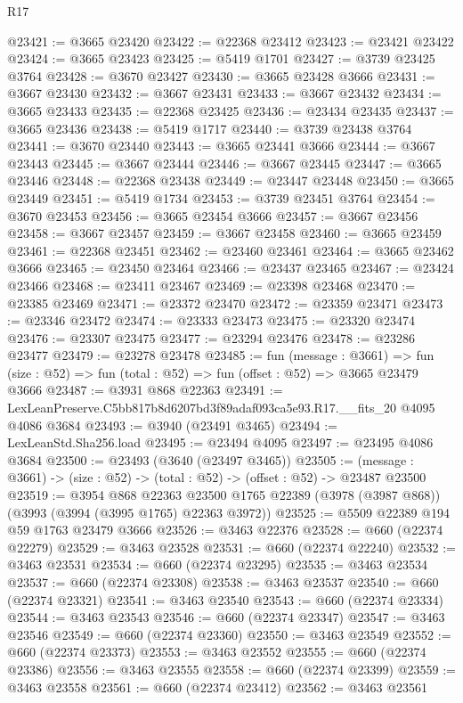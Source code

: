 \begin{lexlean}{R17}
\begin{coremodule}
@23421 := @3665 @23420
@23422 := @22368 @23412
@23423 := @23421 @23422
@23424 := @3665 @23423
@23425 := @5419 @1701
@23427 := @3739 @23425 @3764
@23428 := @3670 @23427
@23430 := @3665 @23428 @3666
@23431 := @3667 @23430
@23432 := @3667 @23431
@23433 := @3667 @23432
@23434 := @3665 @23433
@23435 := @22368 @23425
@23436 := @23434 @23435
@23437 := @3665 @23436
@23438 := @5419 @1717
@23440 := @3739 @23438 @3764
@23441 := @3670 @23440
@23443 := @3665 @23441 @3666
@23444 := @3667 @23443
@23445 := @3667 @23444
@23446 := @3667 @23445
@23447 := @3665 @23446
@23448 := @22368 @23438
@23449 := @23447 @23448
@23450 := @3665 @23449
@23451 := @5419 @1734
@23453 := @3739 @23451 @3764
@23454 := @3670 @23453
@23456 := @3665 @23454 @3666
@23457 := @3667 @23456
@23458 := @3667 @23457
@23459 := @3667 @23458
@23460 := @3665 @23459
@23461 := @22368 @23451
@23462 := @23460 @23461
@23464 := @3665 @23462 @3666
@23465 := @23450 @23464
@23466 := @23437 @23465
@23467 := @23424 @23466
@23468 := @23411 @23467
@23469 := @23398 @23468
@23470 := @23385 @23469
@23471 := @23372 @23470
@23472 := @23359 @23471
@23473 := @23346 @23472
@23474 := @23333 @23473
@23475 := @23320 @23474
@23476 := @23307 @23475
@23477 := @23294 @23476
@23478 := @23286 @23477
@23479 := @23278 @23478
@23485 := fun (message : @3661) =>
  fun (size : @52) => fun (total : @52) => fun (offset : @52) => @3665 @23479 @3666
@23487 := @3931 @868 @22363
@23491 := LexLeanPreserve.C5bb817b8d6207bd3f89adaf093ca5e93.R17.__fits_20 @4095 @4086 @3684
@23493 := @3940 (@23491 @3465)
@23494 := LexLeanStd.Sha256.load
@23495 := @23494 @4095
@23497 := @23495 @4086 @3684
@23500 := @23493 (@3640 (@23497 @3465))
@23505 := (message : @3661) -> (size : @52) -> (total : @52) -> (offset : @52) -> @23487 @23500
@23519 := @3954
    @868
    @22363
    @23500
    @1765
    @22389
    (@3978 (@3987 @868))
    (@3993 (@3994 (@3995 @1765) @22363 @3972))
@23525 := @5509 @22389 @194 @59 @1763 @23479 @3666
@23526 := @3463 @22376
@23528 := @660 (@22374 @22279)
@23529 := @3463 @23528
@23531 := @660 (@22374 @22240)
@23532 := @3463 @23531
@23534 := @660 (@22374 @23295)
@23535 := @3463 @23534
@23537 := @660 (@22374 @23308)
@23538 := @3463 @23537
@23540 := @660 (@22374 @23321)
@23541 := @3463 @23540
@23543 := @660 (@22374 @23334)
@23544 := @3463 @23543
@23546 := @660 (@22374 @23347)
@23547 := @3463 @23546
@23549 := @660 (@22374 @23360)
@23550 := @3463 @23549
@23552 := @660 (@22374 @23373)
@23553 := @3463 @23552
@23555 := @660 (@22374 @23386)
@23556 := @3463 @23555
@23558 := @660 (@22374 @23399)
@23559 := @3463 @23558
@23561 := @660 (@22374 @23412)
@23562 := @3463 @23561

\end{coremodule}
\end{lexlean}
